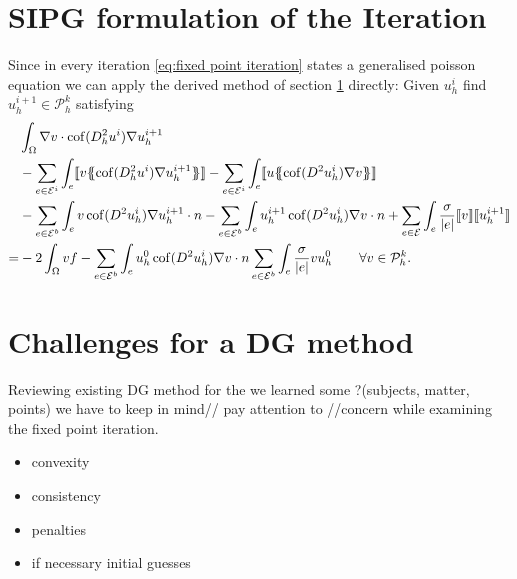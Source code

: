 \section{SIPG formulation of the Iteration}\label{sec: SIPG}
Since in every iteration \eqref{eq:fixed point iteration} states a generalised poisson equation we can apply the derived  method of section \ref{sec: SIPG} directly: Given $u^i_h$ find $u^{i+1}_h \in \mathcal P^k_h$ satisfying
\begin{align}
 &\int_{\Omega} \nabla v \cdot \cof(D_h^2 u^{i}) \nabla u_h^{i+1}\\
 & -\sum\limits_{e \in \bigEps^i}\int_{e} \jump {v \average { \cof(D_h^2 u^{i}) \nabla u_h^{i+1}} }
 - \sum\limits_{e \in \bigEps^i}\int_{e} \jump {u \average{ \cof(D^2 u_h^{i}) \nabla v} } \\  
 & - \sum\limits_{e \in \bigEps^b}\int_{e} v \cof(D^2 u_h^{i}) \nabla u_h^{i+1}\cdot n 
    - \sum\limits_{e \in \bigEps^b}\int_{e} u_h^{i+1}\cof(D^2 u_h^{i}) \nabla v \cdot n
    +\sum\limits_{e \in \bigEps} \int_e \frac \sigma {|e|} \jump v  \jump {u_h^{i+1}}\\
    =& - 2 \int_{\Omega}v f
    	 				-\sum\limits_{e \in \bigEps^b}\int_{e} u_h^0 \cof(D^2 u_h^{i}) \nabla v \cdot n 
    	 				\sum\limits_{e \in \bigEps^b} \int_e \frac \sigma {|e|} v u_h^0    \qquad \forall v \in  \mathcal P^k_h.
    	\label{eq: sipg iteration}
\end{align}


\section{Challenges for a \MA DG method}
Reviewing existing DG method for the \MA we learned some ?(subjects, matter, points) we have to keep in mind// pay attention to //concern while examining the fixed point iteration.

\begin{itemize}
\item convexity
\item consistency
\item penalties
\item if necessary initial guesses
\end{itemize}

